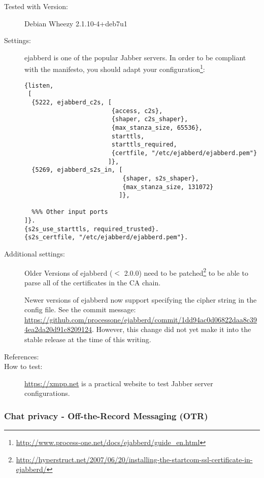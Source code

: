 \begin{description}
\item[Tested with Version:] Debian Wheezy 2.1.10-4+deb7u1

\item[Settings:] \mbox{}


ejabberd is one of the popular Jabber servers.  In order to be compliant
with the manifesto, you should adapt your
configuration\footnote{\url{http://www.process-one.net/docs/ejabberd/guide_en.html}}:
\begin{lstlisting}[breaklines]
{listen,
 [
  {5222, ejabberd_c2s, [
                        {access, c2s},
                        {shaper, c2s_shaper},
                        {max_stanza_size, 65536},
                        starttls,
                        starttls_required, 
                        {certfile, "/etc/ejabberd/ejabberd.pem"}
                       ]},
  {5269, ejabberd_s2s_in, [
                           {shaper, s2s_shaper},
                           {max_stanza_size, 131072}
                          ]},

  %%% Other input ports
]}.
{s2s_use_starttls, required_trusted}.
{s2s_certfile, "/etc/ejabberd/ejabberd.pem"}.
\end{lstlisting}

\item[Additional settings:]

Older Versions of ejabberd ($ < $ 2.0.0) need to be patched\footnote{\url{http://hyperstruct.net/2007/06/20/installing-the-startcom-ssl-certificate-in-ejabberd/}} to be able to parse all of the certificates in the CA chain.

Newer versions of ejabberd now support specifying the cipher string in the config file. See the commit message: \url{https://github.com/processone/ejabberd/commit/1dd94ac0d06822daa8c394ea2da20d91c8209124}. However, this change did not yet make it into the stable release at the time of this writing. 


\item[References:] 

\item[How to test:] \url{https://xmpp.net} is a practical website to test Jabber server configurations.

\end{description}


\subsubsection{Chat privacy - Off-the-Record Messaging (OTR)}

